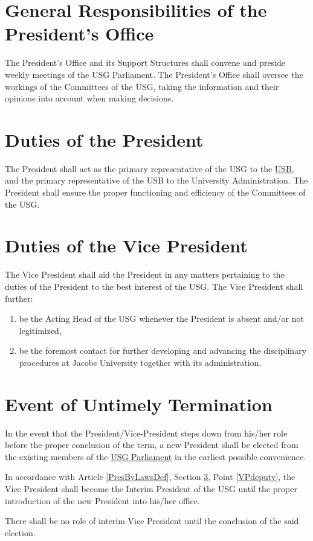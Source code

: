 \label{PresByLawsDef}
\section{General Responsibilities of the President's Office}
The President's Office and its Support Structures shall convene and preside weekly meetings of the USG Parliament. The President's Office shall oversee the workings of the Committees of the USG, taking the information and their opinions into account when making decisions.

\section{Duties of the President}
\label{PresDef}
The President shall act as the primary representative of the USG to the \hyperref[studentbody]{USB}, and the primary representative of the USB to the University Administration.
The President shall ensure the proper functioning and efficiency of the Committees of the USG.


\section{Duties of the Vice President}
\label{VPDef}
The Vice President shall aid the President in any matters pertaining to the duties of the President to the best interest of the USG. The Vice President shall further:
\begin{enumerate}
\item \label{VPdeputy} be the Acting Head of the USG whenever the President is absent and/or not legitimized,
\item be the foremost contact for further developing and advancing the disciplinary procedures at Jacobs University together with its administration.
\end{enumerate}


\section{Event of Untimely Termination}
In the event that the President/Vice-President steps down from his/her role before the proper conclusion of the term, a new President shall be elected from the existing members of the \hyperref[USGParliamentDef]{USG Parliament} in the earliest possible convenience. 
\begin{parenum}
\item In accordance with Article \ref{PresByLawsDef}, Section \ref{VPDef}, Point \ref{VPdeputy}, the Vice President shall become the Interim President of the USG until the proper introduction of the new President into his/her office.
\item There shall be no role of interim Vice President until the conclusion of the said election. 
\end{parenum}